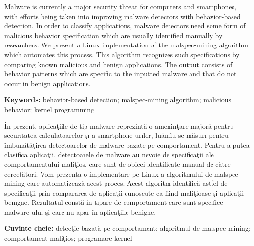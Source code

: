 
Malware is currently a major security threat for computers and smartphones, with efforts being taken into improving malware detectors with behavior-based detection. In order to classify applications, malware detectors need some form of malicious behavior specification which are usually identified manually by researchers. We present a Linux implementation of the malspec-mining algorithm which automates this process. This algorithm recognizes such specifications by comparing known malicious and benign applications. The output consists of behavior patterns which are specific to the inputted malware and that do not occur in benign applications.

\textbf{Keywords:} behavior-based detection; malspec-mining algorithm; malicious behavior; kernel programming

\vspace*{2cm}

În prezent, aplicaţiile de tip malware reprezintă o ameninţare majoră pentru securitatea calculatoarelor şi a smartphone-urilor, luându-se măsuri pentru îmbunătăţirea detectoarelor de malware bazate pe comportament. Pentru a putea clasifica aplicaţii, detectoarele de malware au nevoie de specificaţii ale comportamentului maliţios, care sunt de obicei identificate manual de către cercetători. Vom prezenta o implementare pe Linux a algoritmului de malspec-mining care automatizează acest proces. Acest algoritm identifică astfel de specificaţii prin compararea de aplicaţii cunoscute ca fiind maliţioase şi aplicaţii benigne. Rezultatul constă în tipare de comportament care sunt specifice malware-ului şi care nu apar în aplicaţiile benigne.

\textbf{Cuvinte cheie:} detecţie bazată pe comportament; algoritmul de malspec-mining; comportament maliţios; programare kernel